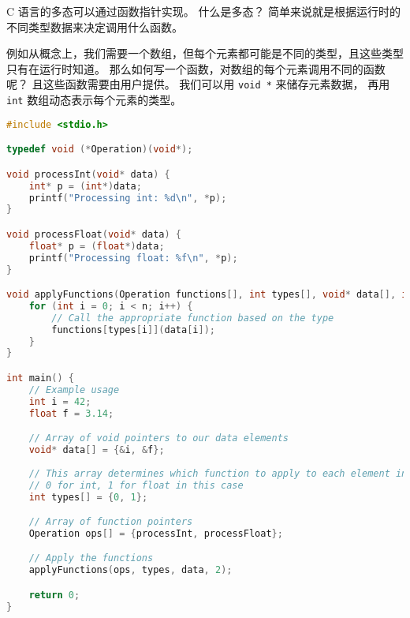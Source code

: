 

C 语言的多态可以通过函数指针实现。 什么是多态？ 简单来说就是根据运行时的不同类型数据来决定调用什么函数。

例如从概念上，我们需要一个数组，但每个元素都可能是不同的类型，且这些类型只有在运行时知道。 那么如何写一个函数，对数组的每个元素调用不同的函数呢？ 且这些函数需要由用户提供。 我们可以用 \verb`void *` 来储存元素数据， 再用 \verb`int` 数组动态表示每个元素的类型。

\begin{lstlisting}[language=cpp]
#include <stdio.h>

typedef void (*Operation)(void*);

void processInt(void* data) {
    int* p = (int*)data;
    printf("Processing int: %d\n", *p);
}

void processFloat(void* data) {
    float* p = (float*)data;
    printf("Processing float: %f\n", *p);
}

void applyFunctions(Operation functions[], int types[], void* data[], int n) {
    for (int i = 0; i < n; i++) {
        // Call the appropriate function based on the type
        functions[types[i]](data[i]);
    }
}

int main() {
    // Example usage
    int i = 42;
    float f = 3.14;

    // Array of void pointers to our data elements
    void* data[] = {&i, &f};
    
    // This array determines which function to apply to each element in 'data'
    // 0 for int, 1 for float in this case
    int types[] = {0, 1};

    // Array of function pointers
    Operation ops[] = {processInt, processFloat};

    // Apply the functions
    applyFunctions(ops, types, data, 2);

    return 0;
}
\end{lstlisting}
